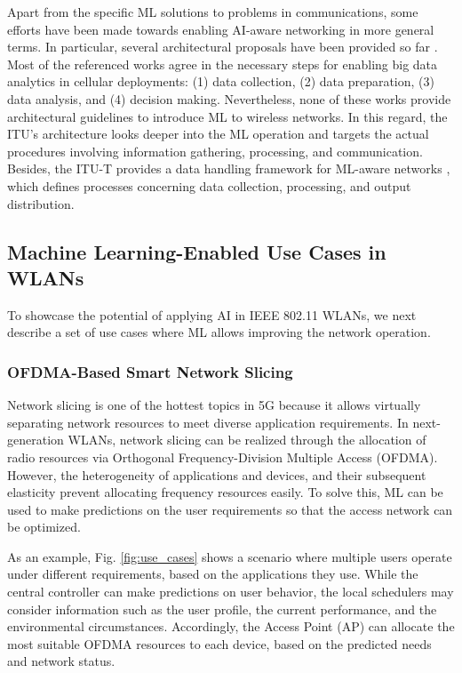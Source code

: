 \documentclass{article}
\begin{document}
Apart from the specific ML solutions to problems in communications, some efforts have been made towards enabling AI-aware networking in more general terms. In particular, several architectural proposals have been provided so far \cite{bi2015wireless,chih2017big,wang2018machine}. Most of the referenced works agree in the necessary steps for enabling big data analytics in cellular deployments: (1) data collection, (2) data preparation, (3) data analysis, and (4) decision making. Nevertheless, none of these works provide architectural guidelines to introduce ML to wireless networks. In this regard, the ITU's architecture looks deeper into the ML operation and targets the actual procedures involving information gathering, processing, and communication. Besides, the ITU-T provides a data handling framework for ML-aware networks \cite{itu2019data}, which defines processes concerning data collection, processing, and output distribution. 

\subsection{Machine Learning-Enabled Use Cases in WLANs}
To showcase the potential of applying AI in IEEE 802.11 WLANs, we next describe a set of use cases where ML allows improving the network operation.

\subsubsection{OFDMA-Based Smart Network Slicing} 
Network slicing is one of the hottest topics in 5G because it allows virtually separating network resources to meet diverse application requirements. In next-generation WLANs, network slicing can be realized through the allocation of radio resources via Orthogonal Frequency-Division Multiple Access (OFDMA). However, the heterogeneity of applications and devices, and their subsequent elasticity prevent allocating frequency resources easily. To solve this, ML can be used to make predictions on the user requirements so that the access network can be optimized.

As an example, Fig. \ref{fig:use_cases} shows a scenario where multiple users operate under different requirements, based on the applications they use. While the central controller can make predictions on user behavior, the local schedulers may consider information such as the user profile, the current performance, and the environmental circumstances. Accordingly, the Access Point (AP) can allocate the most suitable OFDMA resources to each device, based on the predicted needs and network status.
\end{document}
